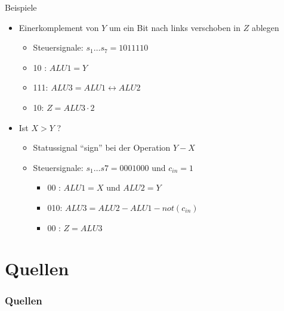 \documentclass[12pt%
,xcolor=table
,aspectratio=169%
]{beamer}
\begin{document}
\begin{frame}{Beispiele}
\begin{itemize}
	\item Einerkomplement von $Y$ um ein Bit nach links verschoben in $Z$ ablegen
	\begin{itemize}
		\item Steuersignale: $s_1 \ldots s_7 = 10 111 10$
		\item 10 : $ALU1 = Y$
		\item 111: $ALU3 = ALU1 \leftrightarrow ALU2$
		\item 10: $Z = ALU3 \cdot 2$
	\end{itemize}
	\item Ist $X > Y$ ?
	\begin{itemize}
		\item Statussignal \enquote{sign} bei der Operation $Y - X$
		\item Steuersignale: $s_1 \ldots s7 = 00 010 00$ und $c_{in} = 1$
		\begin{itemize}
			\item 00 : $ALU1 = X$ und $ALU2 = Y$
			\item 010: $ALU3 = ALU2 - ALU1 - not(c_{in})$
			\item 00 : $Z = ALU3$
		\end{itemize}
	\end{itemize}
\end{itemize}
\end{frame}

\section*{Quellen}
\appendix
\begin{frame}[allowframebreaks]
  \frametitle<presentation>{Quellen}
\printbibliography
\end{frame}
\end{document}
